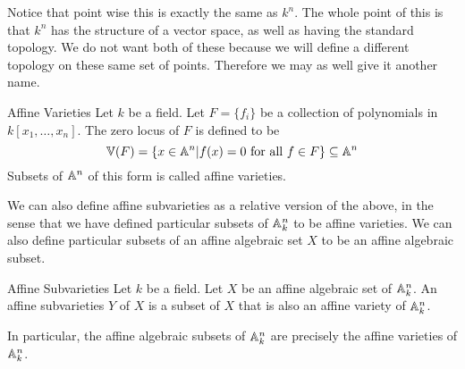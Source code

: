 \documentclass[a4paper]{article}
\begin{document}
Notice that point wise this is exactly the same as $k^n$. The whole point of this is that $k^n$ has the structure of a vector space, as well as having the standard topology. We do not want both of these because we will define a different topology on these same set of points. Therefore we may as well give it another name. 

\begin{defn}{Affine Varieties}{} Let $k$ be a field. Let $F=\{f_i\}$ be a collection of polynomials in $k[x_1,\dots,x_n]$. The zero locus of $F$ is defined to be $$\mathbb{V}(F)=\{x\in\mathbb{A}^n|f(x)=0\text{ for all }f\in F\}\subseteq\mathbb{A}^n$$ Subsets of $\mathbb{A}^n$ of this form is called affine varieties. 
\end{defn}

We can also define affine subvarieties as a relative version of the above, in the sense that we have defined particular subsets of $\mathbb{A}_k^n$ to be affine varieties. We can also define particular subsets of an affine algebraic set $X$ to be an affine algebraic subset. 

\begin{defn}{Affine Subvarieties}{} Let $k$ be a field. Let $X$ be an affine algebraic set of $\mathbb{A}_k^n$. An affine subvarieties $Y$ of $X$ is a subset of $X$ that is also an affine variety of $\mathbb{A}_k^n$. 
\end{defn}

In particular, the affine algebraic subsets of $\mathbb{A}_k^n$ are precisely the affine varieties of $\mathbb{A}_k^n$. 
\end{document}

